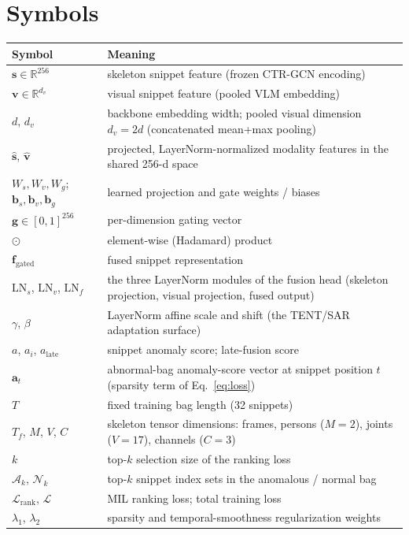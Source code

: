 \section*{Symbols}

\begin{center}
\begin{tabular}{@{}lp{10.5cm}@{}}
\toprule
Symbol & Meaning \\
\midrule
$\mathbf{s} \in \mathbb{R}^{256}$ & skeleton snippet feature (frozen CTR-GCN encoding) \\
$\mathbf{v} \in \mathbb{R}^{d_v}$ & visual snippet feature (pooled VLM embedding) \\
$d$, $d_v$ & backbone embedding width; pooled visual dimension $d_v = 2d$
             (concatenated mean+max pooling) \\
$\hat{\mathbf{s}}$, $\hat{\mathbf{v}}$ & projected, LayerNorm-normalized
             modality features in the shared 256-d space \\
$W_s, W_v, W_g$; $\mathbf{b}_s, \mathbf{b}_v, \mathbf{b}_g$ & learned
             projection and gate weights / biases \\
$\mathbf{g} \in [0,1]^{256}$ & per-dimension gating vector \\
$\odot$ & element-wise (Hadamard) product \\
$\mathbf{f}_{\text{gated}}$ & fused snippet representation \\
$\text{LN}_s$, $\text{LN}_v$, $\text{LN}_f$ & the three LayerNorm modules of
             the fusion head (skeleton projection, visual projection, fused
             output) \\
$\gamma$, $\beta$ & LayerNorm affine scale and shift (the TENT/SAR adaptation
             surface) \\
$a$, $a_i$, $a_{\text{late}}$ & snippet anomaly score; late-fusion score \\
$\mathbf{a}_t$ & abnormal-bag anomaly-score vector at snippet position $t$
             (sparsity term of Eq.~\ref{eq:loss}) \\
$T$ & fixed training bag length (32 snippets) \\
$T_f$, $M$, $V$, $C$ & skeleton tensor dimensions: frames, persons ($M=2$),
             joints ($V=17$), channels ($C=3$) \\
$k$ & top-$k$ selection size of the ranking loss \\
$\mathcal{A}_k$, $\mathcal{N}_k$ & top-$k$ snippet index sets in the anomalous
             / normal bag \\
$\mathcal{L}_{\text{rank}}$, $\mathcal{L}$ & MIL ranking loss; total training
             loss \\
$\lambda_1$, $\lambda_2$ & sparsity and temporal-smoothness regularization
             weights \\
\bottomrule
\end{tabular}
\end{center}

